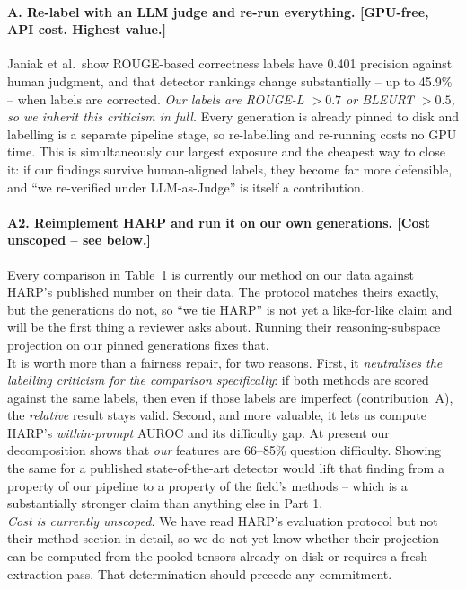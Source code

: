 \documentclass[11pt,a4paper]{article}
\begin{document}
\paragraph{A. Re-label with an LLM judge and re-run everything. [GPU-free, API cost. Highest
value.]} Janiak et al.\ show ROUGE-based correctness labels have 0.401 precision against human
judgment, and that detector rankings change substantially -- up to 45.9\% -- when labels are
corrected. \emph{Our labels are ROUGE-L $>0.7$ or BLEURT $>0.5$, so we inherit this criticism
in full.} Every generation is already pinned to disk and labelling is a separate pipeline stage,
so re-labelling and re-running costs no GPU time. This is simultaneously our largest exposure and
the cheapest way to close it: if our findings survive human-aligned labels, they become far more
defensible, and ``we re-verified under LLM-as-Judge'' is itself a contribution.

\paragraph{A2. Reimplement HARP and run it on our own generations. [Cost unscoped -- see below.]}
Every comparison in Table~1 is currently our method on our data against HARP's published number on
their data. The protocol matches theirs exactly, but the generations do not, so ``we tie HARP'' is
not yet a like-for-like claim and will be the first thing a reviewer asks about. Running their
reasoning-subspace projection on our pinned generations fixes that.
\\[2pt]
It is worth more than a fairness repair, for two reasons. First, it \emph{neutralises the labelling
criticism for the comparison specifically}: if both methods are scored against the same labels,
then even if those labels are imperfect (contribution~A), the \emph{relative} result stays valid.
Second, and more valuable, it lets us compute HARP's \emph{within-prompt} AUROC and its difficulty
gap. At present our decomposition shows that \emph{our} features are 66--85\% question difficulty.
Showing the same for a published state-of-the-art detector would lift that finding from a property
of our pipeline to a property of the field's methods -- which is a substantially stronger claim
than anything else in Part 1.
\\[2pt]
\emph{Cost is currently unscoped.} We have read HARP's evaluation protocol but not their method
section in detail, so we do not yet know whether their projection can be computed from the pooled
tensors already on disk or requires a fresh extraction pass. That determination should precede any
commitment.
\end{document}
